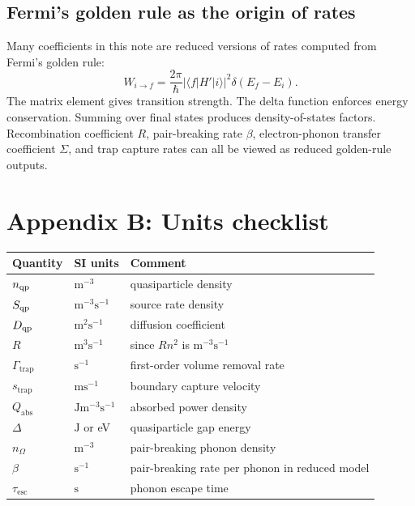 \documentclass[11pt]{article}
\newcommand{\esc}{\mathrm{esc}}
\newcommand{\trap}{\mathrm{trap}}
\begin{document}
\subsection{Fermi's golden rule as the origin of rates}
Many coefficients in this note are reduced versions of rates computed from Fermi's golden rule:
\begin{equation}
W_{i\to f}=\frac{2\pi}{\hbar}|\langle f|H'|i\rangle|^2\delta(E_f-E_i).
\end{equation}
The matrix element gives transition strength. The delta function enforces energy conservation. Summing over final states produces density-of-states factors. Recombination coefficient $R$, pair-breaking rate $\beta$, electron-phonon transfer coefficient $\Sigma$, and trap capture rates can all be viewed as reduced golden-rule outputs.

\section{Appendix B: Units checklist}
\begin{longtable}{p{}p{}p{}}
\toprule
Quantity & SI units & Comment \\
\midrule
$n_{\mathrm{qp}}$ & $\mathrm{m^{-3}}$ & quasiparticle density \\
$S_{\mathrm{qp}}$ & $\mathrm{m^{-3}s^{-1}}$ & source rate density \\
$D_{\mathrm{qp}}$ & $\mathrm{m^2s^{-1}}$ & diffusion coefficient \\
$R$ & $\mathrm{m^3s^{-1}}$ & since $Rn^2$ is $\mathrm{m^{-3}s^{-1}}$ \\
$\Gamma_{\trap}$ & $\mathrm{s^{-1}}$ & first-order volume removal rate \\
$s_{\trap}$ & $\mathrm{ms^{-1}}$ & boundary capture velocity \\
$Q_{\mathrm{abs}}$ & $\mathrm{Jm^{-3}s^{-1}}$ & absorbed power density \\
$\Delta$ & $\mathrm{J}$ or eV & quasiparticle gap energy \\
$n_{\Omega}$ & $\mathrm{m^{-3}}$ & pair-breaking phonon density \\
$\beta$ & $\mathrm{s^{-1}}$ & pair-breaking rate per phonon in reduced model \\
$\tau_{\esc}$ & $\mathrm{s}$ & phonon escape time \\
\bottomrule
\end{longtable}
\end{document}
